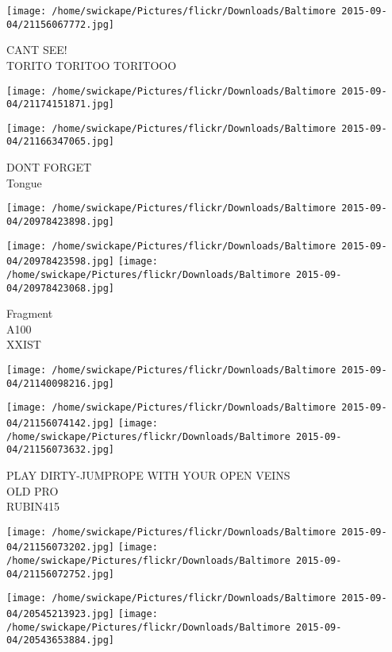 \documentclass[10pt,letterpaper]{article}
\begin{document}
\vspace{0.25in}
\texttt{[image: /home/swickape/Pictures/flickr/Downloads/Baltimore 2015-09-04/21156067772.jpg]}

CANT SEE!\\
TORITO TORITOO TORITOOO
\pagebreak

\texttt{[image: /home/swickape/Pictures/flickr/Downloads/Baltimore 2015-09-04/21174151871.jpg]}

\vspace{0.25in}
\texttt{[image: /home/swickape/Pictures/flickr/Downloads/Baltimore 2015-09-04/21166347065.jpg]}

DONT FORGET\\
Tongue
\pagebreak

\texttt{[image: /home/swickape/Pictures/flickr/Downloads/Baltimore 2015-09-04/20978423898.jpg]}

\vspace{0.25in}
\texttt{[image: /home/swickape/Pictures/flickr/Downloads/Baltimore 2015-09-04/20978423598.jpg]}
\texttt{[image: /home/swickape/Pictures/flickr/Downloads/Baltimore 2015-09-04/20978423068.jpg]}

Fragment\\
A100\\
XXIST
\pagebreak

\texttt{[image: /home/swickape/Pictures/flickr/Downloads/Baltimore 2015-09-04/21140098216.jpg]}

\vspace{0.25in}
\texttt{[image: /home/swickape/Pictures/flickr/Downloads/Baltimore 2015-09-04/21156074142.jpg]}
\texttt{[image: /home/swickape/Pictures/flickr/Downloads/Baltimore 2015-09-04/21156073632.jpg]}

PLAY DIRTY{-}JUMPROPE WITH YOUR OPEN VEINS\\
OLD PRO\\
RUBIN415
\pagebreak

\texttt{[image: /home/swickape/Pictures/flickr/Downloads/Baltimore 2015-09-04/21156073202.jpg]}
\texttt{[image: /home/swickape/Pictures/flickr/Downloads/Baltimore 2015-09-04/21156072752.jpg]}

\texttt{[image: /home/swickape/Pictures/flickr/Downloads/Baltimore 2015-09-04/20545213923.jpg]}
\texttt{[image: /home/swickape/Pictures/flickr/Downloads/Baltimore 2015-09-04/20543653884.jpg]}
\end{document}

